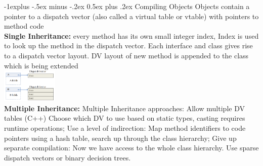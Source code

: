 \documentclass[10pt,landscape]{article}
\makeatletter
\renewcommand{\subsection}{\@startsection{subsection}{2}{0mm}%
                                {-1explus -.5ex minus -.2ex}%
                                {0.5ex plus .2ex}%
                                {\normalfont\normalsize\bfseries}}
\makeatother
\begin{document}
\begin{multicols}{3}
\subsection{Compiling Objects}
Objects contain a pointer to a dispatch vector (also called a virtual table or vtable) with pointers to method code \\
\textbf{Single Inheritance:} every method has its own small integer index, Index is used to look up the method in the dispatch vector. Each interface and class gives rise to a dispatch vector layout. DV layout of new method is appended to the class which is being extended\\
\includegraphics[width = 0.2\textwidth]{assets/dv_layout.png}\\
\textbf{Multiple Inheritance:} Multiple Inheritance approaches: Allow multiple DV tables (C++) Choose which DV to use based on 
static types, casting requires runtime operations; Use a level of indirection: Map method identifiers to code pointers 
using a hash table, search up through the class hierarchy; Give up separate compilation: Now we have access to the whole class hierarchy. Use sparse dispatch vectors or 
binary decision trees.

\end{multicols}
\end{document}
